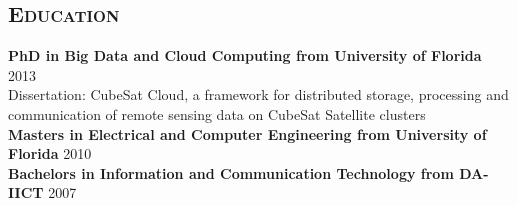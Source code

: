 \begin{resume}
\section{\textsc{Education}}
\textbf{PhD in Big Data and Cloud Computing from University of Florida} \hfill 2013 \\
Dissertation: CubeSat Cloud, a framework for distributed storage, processing and communication of remote sensing data on CubeSat Satellite clusters\\
\textbf{Masters in Electrical and Computer Engineering from University of Florida} \hfill 2010 \\
\textbf{Bachelors in Information and Communication Technology from DA-IICT} \hfill 2007

\begin{formatb}
  \\
  \body\\
\end{formatb}


\end{resume}
